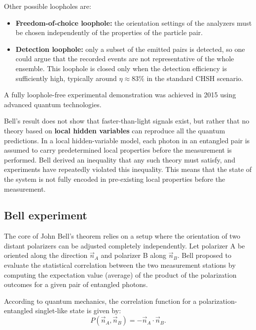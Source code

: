 {Other possible loopholes are:
\begin{itemize}
    \item \textbf{Freedom-of-choice loophole:} the orientation settings of the analyzers must be chosen independently of the properties of the particle pair.
    
    \item \textbf{Detection loophole:} only a subset of the emitted pairs is detected, so one could argue that the recorded events are not representative of the whole ensemble. This loophole is closed only when the detection efficiency is sufficiently high, typically around $\eta \approx 83\%$ in the standard CHSH scenario.
\end{itemize}

A fully loophole-free experimental demonstration was achieved in 2015 using advanced quantum technologies.

Bell's result does not show that faster-than-light signals exist, but rather that no theory based on \textbf{local hidden variables} can reproduce all the quantum predictions. In a local hidden-variable model, each photon in an entangled pair is assumed to carry predetermined local properties before the measurement is performed. Bell derived an inequality that any such theory must satisfy, and experiments have repeatedly violated this inequality. 
This means that the state of the system is not fully encoded in pre-existing local properties before the measurement.
}


\subsection{Bell experiment}

The core of John Bell's theorem relies on a setup where the orientation of two distant polarizers can be adjusted completely independently. Let polarizer A be oriented along the direction $\vec{n}_A$ and polarizer B along $\vec{n}_B$. Bell proposed to evaluate the statistical correlation between the two measurement stations by computing the expectation value (average) of the product of the polarization outcomes for a given pair of entangled photons.

According to quantum mechanics, the correlation function for a polarization-entangled singlet-like state is given by:
\begin{equation}\label{eqn:15-quantum-correlation}
P(\vec{n}_A,\vec{n}_B) = -\vec{n}_A\cdot\vec{n}_B.
\end{equation}


